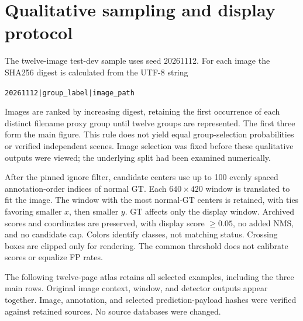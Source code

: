\documentclass[10pt,letterpaper]{article}
\begin{document}
\section{Qualitative sampling and display protocol}
The twelve-image test-dev sample uses seed 20261112. For each image the SHA256 digest is calculated from the UTF-8 string
\begin{center}\texttt{20261112|group\_label|image\_path}\end{center} Images are ranked by increasing digest, retaining the first occurrence of each distinct filename proxy group until twelve groups are represented. The first three form the main figure. This rule does not yield equal group-selection probabilities or verified independent scenes. Image selection was fixed before these qualitative outputs were viewed; the underlying split had been examined numerically.

After the pinned ignore filter, candidate centers use up to 100 evenly spaced annotation-order indices of normal GT. Each $640\times420$ window is translated to fit the image. The window with the most normal-GT centers is retained, with ties favoring smaller $x$, then smaller $y$. GT affects only the display window. Archived scores and coordinates are preserved, with display score $\geq0.05$, no added NMS, and no candidate cap. Colors identify classes, not matching status. Crossing boxes are clipped only for rendering. The common threshold does not calibrate scores or equalize FP rates.

The following twelve-page atlas retains all selected examples, including the three main rows. Original image context, window, and detector outputs appear together. Image, annotation, and selected prediction-payload hashes were verified against retained sources. No source databases were changed.
\clearpage

\end{document}
